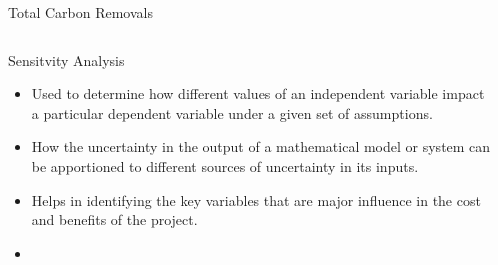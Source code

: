 \documentclass[final]{beamer}\usepackage[]{graphicx}\usepackage[]{color}
\newenvironment{knitrout}{}{} %
\newlength{\onecolwid}
\newlength{\twocolwid}
\begin{document}
\begin{frame}[t]
\begin{columns}[t]
\begin{column}{\twocolwid}
\begin{alertblock}{Total Carbon Removals}
\begin{knitrout}
{}



\end{knitrout}
\vfill
\end{alertblock} 


\begin{columns}[t,totalwidth=\twocolwid] %

\begin{column}{\onecolwid} %


\begin{block}{Sensitvity Analysis}
\begin{itemize}
\item Used to determine how different values of an independent variable impact a particular dependent variable under a given set of assumptions. 
\item How the uncertainty in the output of a mathematical model or system can be apportioned to different sources of uncertainty in its inputs.
\item Helps in identifying the key variables that are major influence in the cost and benefits of the project.
\item 
\end{itemize}

\end{block}


\end{column} %

\begin{column}{\onecolwid} %



\end{column}
\end{columns}
\end{column}
\end{columns}
\end{frame}
\end{document}
